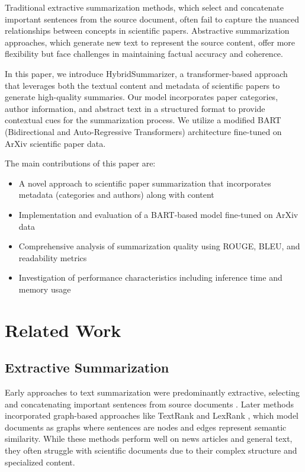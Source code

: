 \documentclass[conference]{IEEEtran}
\begin{document}
Traditional extractive summarization methods, which select and concatenate important sentences from the source document, often fail to capture the nuanced relationships between concepts in scientific papers. Abstractive summarization approaches, which generate new text to represent the source content, offer more flexibility but face challenges in maintaining factual accuracy and coherence.

In this paper, we introduce HybridSummarizer, a transformer-based approach that leverages both the textual content and metadata of scientific papers to generate high-quality summaries. Our model incorporates paper categories, author information, and abstract text in a structured format to provide contextual cues for the summarization process. We utilize a modified BART (Bidirectional and Auto-Regressive Transformers) architecture fine-tuned on ArXiv scientific paper data.

The main contributions of this paper are:
\begin{itemize}
\item A novel approach to scientific paper summarization that incorporates metadata (categories and authors) along with content
\item Implementation and evaluation of a BART-based model fine-tuned on ArXiv data
\item Comprehensive analysis of summarization quality using ROUGE, BLEU, and readability metrics
\item Investigation of performance characteristics including inference time and memory usage
\end{itemize}

\section{Related Work}

\subsection{Extractive Summarization}
Early approaches to text summarization were predominantly extractive, selecting and concatenating important sentences from source documents \cite{luhn1958automatic}. Later methods incorporated graph-based approaches like TextRank \cite{mihalcea2004textrank} and LexRank \cite{erkan2004lexrank}, which model documents as graphs where sentences are nodes and edges represent semantic similarity. While these methods perform well on news articles and general text, they often struggle with scientific documents due to their complex structure and specialized content.
\end{document}

